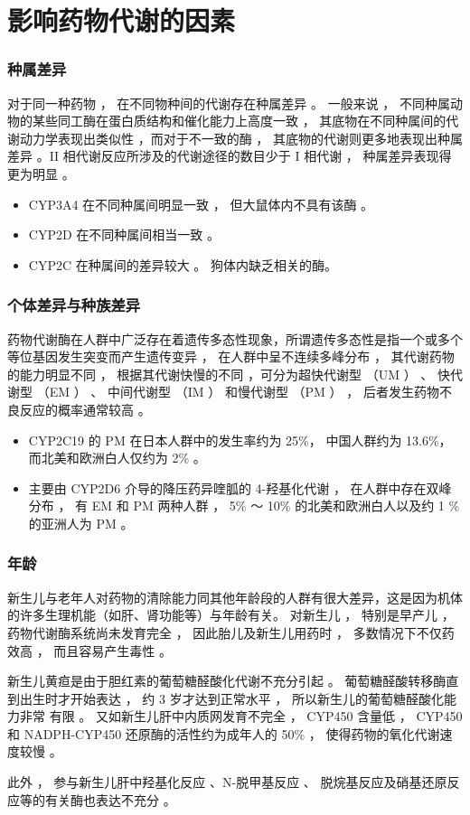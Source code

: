 \documentclass[dvipsnames, svgnames, x11names]{beamer}
\begin{document}
\section{影响药物代谢的因素}

\begin{frame}
    \frametitle{种属差异}
    对于同一种药物 ， 在不同物种间的代谢存在种属差异 。 一般来说 ， 不同种属动物的某些同工酶在蛋白质结构和催化能力上高度一致 ， 其底物在不同种属间的代谢动力学表现出类似性 ，而对于不一致的酶 ， 其底物的代谢则更多地表现出种属差异 。II 相代谢反应所涉及的代谢途径的数目少于 I 相代谢 ， 种属差异表现得更为明显 。
    \begin{itemize}
      \item CYP3A4 在不同种属间明显一致 ， 但大鼠体内不具有该酶 。
      \item CYP2D 在不同种属间相当一致 。
      \item CYP2C 在种属间的差异较大 。 狗体内缺乏相关的酶。
    \end{itemize}
\end{frame}


\begin{frame}
    \frametitle{个体差异与种族差异}
    药物代谢酶在人群中广泛存在着遗传多态性现象，所谓遗传多态性是指一个或多个等位基因发生突变而产生遗传变异 ， 在人群中呈不连续多峰分布 ， 其代谢药物的能力明显不同 ， 根据其代谢快慢的不同 ，可分为超快代谢型 （UM ） 、 快代谢型 （EM ） 、 中间代谢型 （IM ） 和慢代谢型 （PM ） ， 后者发生药物不良反应的概率通常较高 。
    \begin{itemize}
      \item CYP2C19 的 PM 在日本人群中的发生率约为 25\%， 中国人群约为 13.6\%， 而北美和欧洲白人仅约为 2\% 。 
      \item 主要由 CYP2D6 介导的降压药异喹胍的 4-羟基化代谢 ， 在人群中存在双峰分布 ， 有 EM 和 PM 两种人群 ， 5\% ～ 10\% 的北美和欧洲白人以及约 1 \% 的亚洲人为 PM 。 
    \end{itemize}
\end{frame}


\begin{frame}
  \frametitle{年龄}
  新生儿与老年人对药物的清除能力同其他年龄段的人群有很大差异，这是因为机体的许多生理机能（如肝、肾功能等）与年龄有关。 对新生儿 ， 特别是早产儿 ， 药物代谢酶系统尚未发育完全 ， 因此胎儿及新生儿用药时 ， 多数情况下不仅药效高 ， 而且容易产生毒性 。
  \begin{blankblock}{}
    新生儿黄疸是由于胆红素的葡萄糖醛酸化代谢不充分引起 。 葡萄糖醛酸转移酶直到出生时才开始表达 ， 约 3 岁才达到正常水平 ， 所以新生儿的葡萄糖醛酸化能力非常
    有限 。 又如新生儿肝中内质网发育不完全 ， CYP450 含量低 ， CYP450 和 NADPH-CYP450 还原酶的活性约为成年人的 50\% ， 使得药物的氧化代谢速度较慢 。 
    
    此外 ， 参与新生儿肝中羟基化反应 、N-脱甲基反应 、 脱烷基反应及硝基还原反应等的有关酶也表达不充分 。
  \end{blankblock}
\end{frame}
\end{document}
